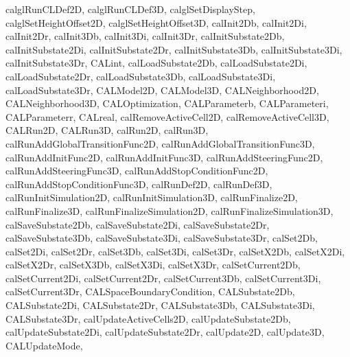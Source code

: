 {{    calglRunCLDef2D,
    calglRunCLDef3D,
    calglSetDisplayStep,
    calglSetHeightOffset2D,
    calglSetHeightOffset3D,
    calInit2Db,
    calInit2Di,
    calInit2Dr,
    calInit3Db,
    calInit3Di,
    calInit3Dr,
    calInitSubstate2Db,
    calInitSubstate2Di,
    calInitSubstate2Dr,
    calInitSubstate3Db,
    calInitSubstate3Di,
    calInitSubstate3Dr,
    CALint,
    calLoadSubstate2Db,
    calLoadSubstate2Di,
    calLoadSubstate2Dr,
    calLoadSubstate3Db,
    calLoadSubstate3Di,
    calLoadSubstate3Dr,
    CALModel2D,
    CALModel3D,
    CALNeighborhood2D,
    CALNeighborhood3D,
    CALOptimization,
    CALParameterb,
    CALParameteri,
    CALParameterr,
    CALreal,
    calRemoveActiveCell2D,
    calRemoveActiveCell3D,
    CALRun2D,
    CALRun3D,
    calRun2D,
    calRun3D,
    calRunAddGlobalTransitionFunc2D,
    calRunAddGlobalTransitionFunc3D,
    calRunAddInitFunc2D,
    calRunAddInitFunc3D,
    calRunAddSteeringFunc2D,
    calRunAddSteeringFunc3D,
    calRunAddStopConditionFunc2D,
    calRunAddStopConditionFunc3D,
    calRunDef2D,
    calRunDef3D,
    calRunInitSimulation2D,
    calRunInitSimulation3D,
    calRunFinalize2D,
    calRunFinalize3D,
    calRunFinalizeSimulation2D,
    calRunFinalizeSimulation3D,
    calSaveSubstate2Db,
    calSaveSubstate2Di,
    calSaveSubstate2Dr,
    calSaveSubstate3Db,
    calSaveSubstate3Di,
    calSaveSubstate3Dr,
    calSet2Db,
    calSet2Di,
    calSet2Dr,
    calSet3Db,
    calSet3Di,
    calSet3Dr,
    calSetX2Db,
    calSetX2Di,
    calSetX2Dr,
    calSetX3Db,
    calSetX3Di,
    calSetX3Dr,
    calSetCurrent2Db,
    calSetCurrent2Di,
    calSetCurrent2Dr,
    calSetCurrent3Db,
    calSetCurrent3Di,
    calSetCurrent3Dr,
    CALSpaceBoundaryCondition,
    CALSubstate2Db,
    CALSubstate2Di,
    CALSubstate2Dr,
    CALSubstate3Db,
    CALSubstate3Di,
    CALSubstate3Dr,
    calUpdateActiveCells2D,
    calUpdateSubstate2Db,
    calUpdateSubstate2Di,
    calUpdateSubstate2Dr,
    calUpdate2D,
    calUpdate3D,
    CALUpdateMode,
    }
}


